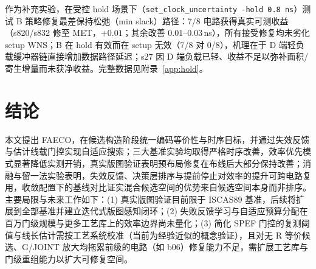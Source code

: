 \documentclass[journal]{IEEEtran}
\begin{document}
作为补充实验，在受控 hold 场景下（\texttt{set\_clock\_uncertainty -hold 0.8\,ns}）测试 B 策略修复最差保持松弛（min slack）路径：7/8 电路获得真实可测收益（s820/s832 修至 MET，$+0.01$；其余改善 $0.01$--$0.03\,$ns），所有接受修复均未劣化 setup WNS；B 在 hold 有效而在 setup 无效（7/8 对 0/8），机理在于 D 端轻负载缓冲器链直接增加数据路径延迟；s27 因 D 端负载已轻、收益不足以弥补面积/寄生增量而未获净收益。完整数据见附录~\ref{app:hold}。

\section{结论}\label{sec:conclusion}

本文提出 FAECO，在候选构造阶段统一编码等价性与时序目标，并通过失效反馈与估计线载门控实现自适应搜索；三大基准实验均取得严格时序改善，效率优先模式显著降低实测开销，真实版图验证表明预布局修复在布线后大部分保持改善；消融与留一法实验表明，失效反馈、决策层排序与提前停止对效率的提升可跨电路复用，收敛配置下的基线对比证实混合候选空间的优势来自候选空间本身而非排序。主要局限与未来工作如下：(1) 真实版图验证目前限于 ISCAS89 基准，后续将扩展到全部基准并建立迭代式版图感知闭环；(2) 失败反馈学习与自适应预算分配在百万门级规模与更多工艺库上的效率边界尚未量化；(3) 简化 SPEF 门控的复测阈值与线长估计需按工艺系统校准（当前为经验近似的概念验证），且对无 R 等价候选、G/JOINT 放大均拖累前级的电路（如 b06）修复能力不足，需扩展工艺库与门级重组能力以扩大可修复空间。
\end{document}

